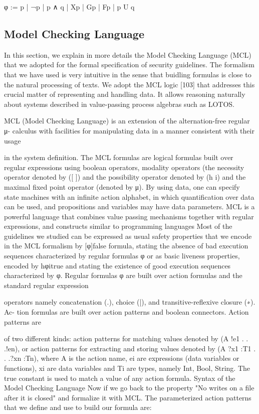 \documentclass[10pt]{article}
\begin{document}
φ := p | ¬p | p ∧ q | Xp | Gp | Fp | p U q

\subsection{Model Checking Language}
In this section, we explain in more details the Model Checking Language (MCL) that
we adopted for the formal specification of security guidelines. The formalism that we
have used is very intuitive in the sense that buidling formulas is close to the natural
processing of texts. We adopt the MCL logic [103] that addresses this crucial matter of
representing and handling data. It allows reasoning naturally about systems described
in value-passing process algebras such as LOTOS.

MCL (Model Checking Language) is an extension of the alternation-free regular μ-
calculus with facilities for manipulating data in a manner consistent with their usage

in the system definition. The MCL formulas are logical formulas built over regular
expressions using boolean operators, modality operators (the necessity operator denoted
by ([ ]) and the possibility operator denoted by (h i) and the maximal fixed point
operator (denoted by μ).
By using data, one can specify state machines with an infinite action alphabet, in
which quantification over data can be used, and propositions and variables may have
data parameters. MCL is a powerful language that combines value passing mechanisms
together with regular expressions, and constructs similar to programming languages
Most of the guidelines we studied can be expressed as usual safety properties that we
encode in the MCL formalism by [φ]false formula, stating the absence of bad execution
sequences characterized by regular formulas φ or as basic liveness properties, encoded
by hφitrue and stating the existence of good execution sequences characterized by φ.
Regular formulas φ are built over action formulas and the standard regular expression

operators namely concatenation (.), choice (|), and transitive-reflexive closure (∗). Ac-
tion formulas are built over action patterns and boolean connectors. Action patterns are

of two different kinds: action patterns for matching values denoted by ({A !e1 . . .!en}),
or action patterns for extracting and storing values denoted by ({A ?x1 :T1 . . .?xn :Tn}),
where A is the action name, ei are expressions (data variables or functions), xi are data
variables and Ti are types, namely Int, Bool, String. The true constant is used to
match a value of any action formula.
Syntax of the Model Checking Language Now if we go back to the property "No
writes on a file after it is closed" and formalize it with MCL. The parameterized action
patterns that we define and use to build our formula are:
\end{document}
